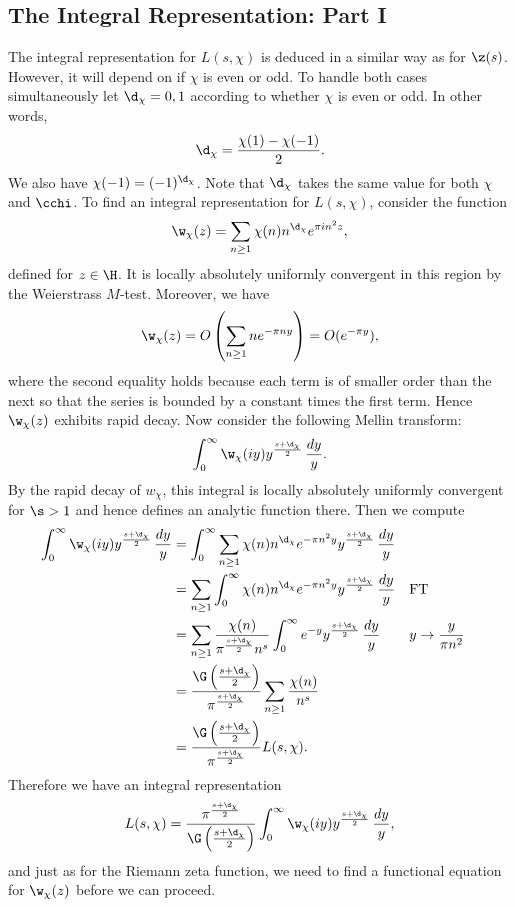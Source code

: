     \subsection*{The Integral Representation: Part I}
      The integral representation for $L(s,\chi)$ is deduced in a similar way as for $\z(s)$. However, it will depend on if $\chi$ is even or odd. To handle both cases simultaneously let $\d_{\chi} = 0,1$ according to whether $\chi$ is even or odd. In other words,
      \[
        \d_{\chi} = \frac{\chi(1)-\chi(-1)}{2}.
      \]
      We also have $\chi(-1) = (-1)^{\d_{\chi}}$. Note that $\d_{\chi}$ takes the same value for both $\chi$ and $\cchi$. To find an integral representation for $L(s,\chi)$, consider the function
      \[
        \w_{\chi}(z) = \sum_{n \ge 1}\chi(n)n^{\d_{\chi}}e^{\pi in^{2}z},
      \]
      defined for $z \in \H$. It is locally absolutely uniformly convergent in this region by the Weierstrass $M$-test. Moreover, we have
      \[
        \w_{\chi}(z) = O\left(\sum_{n \ge 1}ne^{-\pi ny}\right) = O(e^{-\pi y}),
      \]
      where the second equality holds because each term is of smaller order than the next so that the series is bounded by a constant times the first term. Hence $\w_{\chi}(z)$ exhibits rapid decay. Now consider the following Mellin transform:
      \[
        \int_{0}^{\infty}\w_{\chi}(iy)y^{\frac{s+\d_{\chi}}{2}}\,\frac{dy}{y}.
      \]
      By the rapid decay of $w_{\chi}$, this integral is locally absolutely uniformly convergent for $\s > 1$ and hence defines an analytic function there. Then we compute
      \begin{align*}
        \int_{0}^{\infty}\w_{\chi}(iy)y^{\frac{s+\d_{\chi}}{2}}\,\frac{dy}{y} &= \int_{0}^{\infty}\sum_{n \ge 1}\chi(n)n^{\d_{\chi}}e^{-\pi n^{2}y}y^{\frac{s+\d_{\chi}}{2}}\,\frac{dy}{y} \\
        &= \sum_{n \ge 1}\int_{0}^{\infty}\chi(n)n^{\d_{\chi}}e^{-\pi n^{2}y}y^{\frac{s+\d_{\chi}}{2}}\,\frac{dy}{y} && \text{FT} \\
        &= \sum_{n \ge 1}\frac{\chi(n)}{\pi^{\frac{s+\d_{\chi}}{2}}n^{s}}\int_{0}^{\infty}e^{-y}y^{\frac{s+\d_{\chi}}{2}}\,\frac{dy}{y} && \text{$y \to \frac{y}{\pi n^{2}}$} \\
        &= \frac{\G\left(\frac{s+\d_{\chi}}{2}\right)}{\pi^{\frac{s+\d_{\chi}}{2}}}\sum_{n \ge 1}\frac{\chi(n)}{n^{s}} \\
        &= \frac{\G\left(\frac{s+\d_{\chi}}{2}\right)}{\pi^{\frac{s+\d_{\chi}}{2}}}L(s,\chi).
      \end{align*}
      Therefore we have an integral representation
      \begin{equation}\label{equ:integral_representation_Dirichlet_L-functions_1}
        L(s,\chi) = \frac{\pi^{\frac{s+\d_{\chi}}{2}}}{\G\left(\frac{s+\d_{\chi}}{2}\right)}\int_{0}^{\infty}\w_{\chi}(iy)y^{\frac{s+\d_{\chi}}{2}}\,\frac{dy}{y},
      \end{equation}
      and just as for the Riemann zeta function, we need to find a functional equation for $\w_{\chi}(z)$ before we can proceed.
